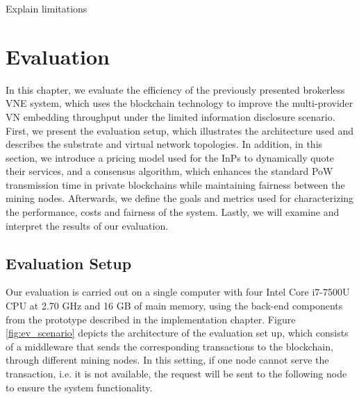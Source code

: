 Explain limitations


\chapter{Evaluation}
\label{ch:evaluation}

In this chapter, we evaluate the efficiency of the previously presented brokerless VNE system, which uses the blockchain technology to improve the multi-provider VN embedding throughput under the limited information disclosure scenario. First, we present the evaluation setup, which illustrates the architecture used and describes the substrate and virtual network topologies. In addition, in this section, we introduce a pricing model used for the InPs to dynamically quote their services, and a consensus algorithm, which enhances the standard PoW transmission time in private blockchains while maintaining fairness between the mining nodes. Afterwards, we define the goals and metrics used for characterizing the performance, costs and fairness of the system. Lastly, we will examine and interpret the results of our evaluation.

\section{Evaluation Setup}

Our evaluation is carried out on a single computer with four Intel Core i7-7500U CPU at 2.70 GHz and 16 GB of main memory, using the back-end components from the prototype described in the implementation chapter. Figure \ref{fig:ev_scenario} depicts the architecture of the evaluation set up, which consists of a middleware that sends the corresponding transactions to the blockchain, through different mining nodes. In this setting, if one node cannot serve the transaction, i.e. it is not available, the request will be sent to the following node to ensure the system functionality.

